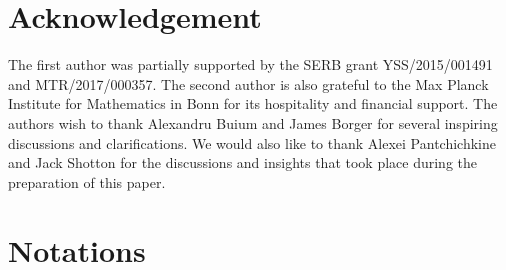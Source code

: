 \documentclass{amsart}
\numberwithin{equation}{section}
\begin{document}
 \section{Acknowledgement}
The first author was partially supported by the SERB grant YSS/2015/001491 and
MTR/2017/000357.
The second author is also grateful to the Max Planck Institute for Mathematics 
in Bonn for its hospitality and financial support.
The authors wish to thank Alexandru Buium and James Borger for several 
inspiring discussions and clarifications. 
We would also like to thank Alexei Pantchichkine and 
Jack Shotton for the discussions and 
insights that took place during the preparation of this paper.


\section{Notations}
\end{document}
